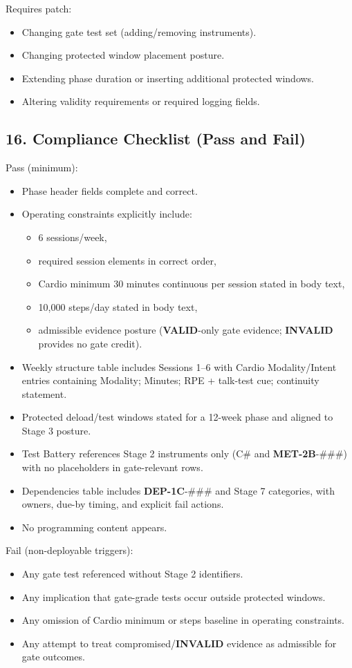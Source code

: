 \documentclass[10pt]{article}
\begin{document}
Requires patch:

\begin{itemize}
\item Changing gate test set (adding/removing instruments).
\item Changing protected window placement posture.
\item Extending phase duration or inserting additional protected windows.
\item Altering validity requirements or required logging fields.
\end{itemize}

\subsection*{16. Compliance Checklist (Pass and Fail)}


Pass (minimum):

\begin{itemize}
\item Phase header fields complete and correct.
\item Operating constraints explicitly include:
  \begin{itemize}
  \item 6 sessions/week,
  \item required session elements in correct order,
  \item Cardio minimum 30 minutes continuous per session stated in body text,
  \item 10,000 steps/day stated in body text,
  \item admissible evidence posture (\textbf{VALID}-only gate evidence; \textbf{INVALID} provides no gate credit).
  \end{itemize}
\item Weekly structure table includes Sessions 1–6 with Cardio Modality/Intent entries containing Modality; Minutes; RPE + talk-test cue; continuity statement.
\item Protected deload/test windows stated for a 12-week phase and aligned to Stage 3 posture.
\item Test Battery references Stage 2 instruments only (C\# and \textbf{MET-2B}-\#\#\#) with no placeholders in gate-relevant rows.
\item Dependencies table includes \textbf{DEP-1C}-\#\#\# and Stage 7 categories, with owners, due-by timing, and explicit fail actions.
\item No programming content appears.
\end{itemize}

Fail (non-deployable triggers):

\begin{itemize}
\item Any gate test referenced without Stage 2 identifiers.
\item Any implication that gate-grade tests occur outside protected windows.
\item Any omission of Cardio minimum or steps baseline in operating constraints.
\item Any attempt to treat compromised/\textbf{INVALID} evidence as admissible for gate outcomes.
\end{itemize}
\end{document}
